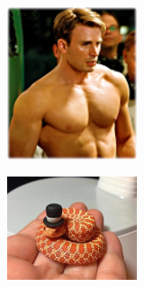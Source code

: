 \documentclass[11pt]{exam}
\begin{document}
\begin{questions}
\begin{figure}[h]
    \centering
    \begin{subfigure}[b]{0.3\textwidth}
\addtocounter{subfigure}{3}
        \includegraphics[width=\textwidth]{cute4}
        \caption{\underline{\hspace{2cm}}}
        \label{fig:dude}
    \end{subfigure}
    \begin{subfigure}[b]{0.3\textwidth}
        \includegraphics[width=\textwidth]{cute5}

\end{subfigure}
\end{figure}
\end{questions}
\end{document}
